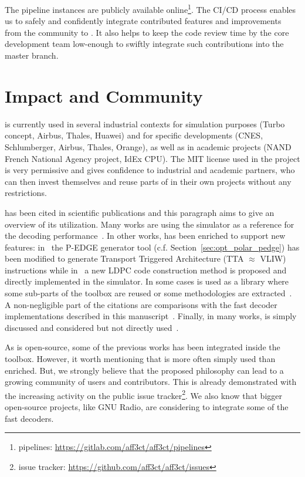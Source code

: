 The \AFFECT pipeline instances are publicly available online\footnote{\AFFECT
pipelines: \url{https://gitlab.com/aff3ct/aff3ct/pipelines}}. The CI/CD process
enables us to safely and confidently integrate contributed features and
improvements from the community to \AFFECT. It also helps to keep the code
review time by the core development team low-enough to swiftly integrate such
contributions into the master branch.

\section{Impact and Community}
\label{sec:aff3ct_impact}

\AFFECT is currently used in several industrial contexts for simulation purposes
(Turbo concept, Airbus, Thales, Huawei) and for specific developments (CNES,
Schlumberger, Airbus, Thales, Orange), as well as in academic projects (NAND
French National Agency project, IdEx CPU). The MIT license used in the project
is very permissive and gives confidence to industrial and academic partners, who
can then invest themselves and reuse parts of \AFFECT in their own projects
without any restrictions.

\AFFECT has been cited in scientific publications and this paragraph aims to
give an overview of its utilization. Many works are using the \AFFECT simulator
as a reference for the decoding performance~\cite{Pignoly2018,
Poulenard2018,Ghanaatian2018,Wang2019,Hsieh2020,Rush2020,Duffy2020}. In other
works, \AFFECT has been enriched to support new features:
in~\cite{Leonardon2018b} the P-EDGE generator tool (c.f.
Section~\ref{sec:opt_polar_pedge}) has been modified to generate Transport
Triggered Architecture (TTA $\approx$ VLIW) instructions while
in~\cite{Tasdighi2020} a new LDPC code construction method is proposed and
directly implemented in the \AFFECT simulator. In some cases \AFFECT is used as
a library where some sub-parts of the toolbox are reused or some methodologies
are extracted~\cite{Florian2018,Cavatassi2019a,Cavatassi2019b,Ercan2020}. A
non-negligible part of the citations are comparisons with the fast decoder
implementations described in this manuscript~\cite{Zeng2017,Leonardon2018a,
Guermouche2019,LeGal2019a,Shen2020}. Finally, in many works, \AFFECT is simply
discussed and considered but not directly used~\cite{Debbabi2016,Debbabi2016a,
Ercan2017,Natarajan2018,Cenova2019,Krainyk2019,Vameghestahbanati2019,
Mohammed2019,Shaheen2019,Aly2019,Delomier2020}.

As \AFFECT is open-source, some of the previous works has been integrated inside
the toolbox. However, it worth mentioning that \AFFECT is more often simply used
than enriched. But, we strongly believe that the proposed philosophy can lead to
a growing community of users and contributors. This is already demonstrated with
the increasing activity on the public issue tracker\footnote{\AFFECT issue
tracker: \url{https://github.com/aff3ct/aff3ct/issues}}. We also know that
bigger open-source projects, like GNU Radio, are considering to integrate some
of the \AFFECT fast decoders.

